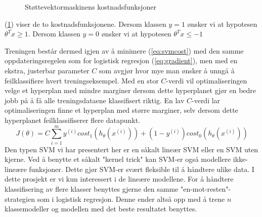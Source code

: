 \begin{figure}[h!]
\begin{subfigure}{0.5\textwidth}
\centering
{}
\end{subfigure}
\begin{subfigure}{0.5\textwidth}
\centering
{}
\end{subfigure}
\caption{Støttevektormaskinens kostnadsfunksjoner}
\label{figure:svmcost}
\end{figure}
(\ref{figure:svmcost}) viser de to kostnadsfunksjonene. Dersom klassen $y=1$ ønsker vi at hypotesen $\theta^{T}x \geq 1$. Dersom klassen $y=0$ ønsker vi at hypotesen $\theta^{T}x \leq -1$

Treningen består dermed igjen av å minimere (\ref{eq:svmcost}) med den samme oppdateringsregelen som for logistisk regresjon (\ref{eq:gradient}), men med en ekstra, justerbar parameter $C$ som avgjør hvor mye man ønsker å unngå å feilklassifiere hvert treningseksempel. Med en stor $C$-verdi vil optimaliseringen velge et hyperplan med mindre marginer dersom dette hyperplanet gjør en bedre jobb på å få alle treningsdataene klassifisert riktig. En lav $C$-verdi lar optimaliseringen finne et hyperplan med større marginer, selv dersom dette hyperplanet feilklassifiserer flere datapunkt.
\begin{equation}
J(\theta) = 
    C \sum_{i=1}^{m} y^{(i)}cost_1(h_\theta(x^{(i)})) + (1-y^{(i)})cost_0(h_\theta(x^{(i)}))
\label{eq:svmcost}
\end{equation}
Den typen SVM vi har presentert her er en såkalt lineær SVM eller en SVM uten kjerne. Ved å benytte et såkalt "kernel trick" kan SVM-er også modellere ikke-lineære funksjoner. Dette gjør SVM-er svært fleksible til å håndtere ulike data. I dette prosjekt er vi kun interessert i de lineære modellene. For å håndtere klassifisering av flere klasser benyttes gjerne den samme "en-mot-resten"-strategien som i logistisk regresjon. Denne ender altså opp med å trene $n$ klassemodeller og modellen med det beste resultatet benyttes.

